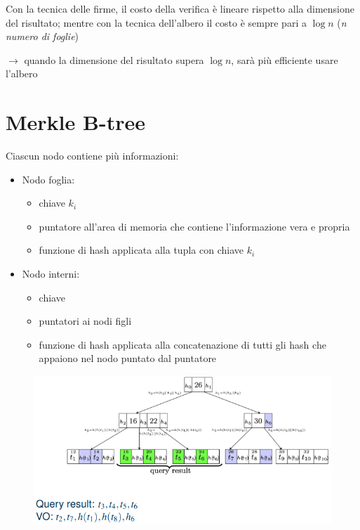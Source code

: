 \documentclass{report}
\begin{document}
\noindent Con la tecnica delle firme, il costo della verifica è lineare rispetto alla dimensione del risultato; mentre 
con la tecnica dell'albero il costo è sempre pari a $\log n$ (\textit{n numero di foglie})

$\rightarrow$ quando la dimensione del risultato supera $\log n$, sarà più efficiente usare l'albero

\section{Merkle B-tree}
Ciascun nodo contiene più informazioni:
\begin{itemize}
    \item Nodo foglia:
    \begin{itemize}
        \item chiave $k_i$
        \item puntatore all'area di memoria che contiene l'informazione vera e propria 
        \item funzione di hash applicata alla tupla con chiave $k_i$
    \end{itemize}
    \item Nodo interni:
    \begin{itemize}
        \item chiave
        \item puntatori ai nodi figli 
        \item funzione di hash applicata alla concatenazione di tutti gli hash che appaiono nel nodo puntato dal puntatore
    \end{itemize}
\end{itemize}

\begin{figure}[H]
    \centering
    \includegraphics[width=1\linewidth]{images/mb-tree}
\end{figure}
\end{document}
